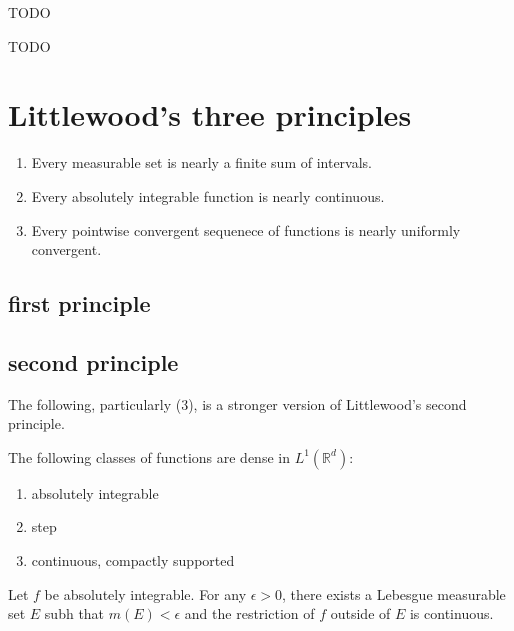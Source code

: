 \documentclass[12pt]{article}
\begin{document}
\begin{proposition}
	TODO
\end{proposition}

\begin{proposition}
	TODO
\end{proposition}



\section{Littlewood's three principles} %

\begin{enumerate}
	\item Every measurable set is nearly a finite sum of intervals.
	\item Every absolutely integrable function is nearly continuous.
	\item Every pointwise convergent sequenece of functions is nearly uniformly convergent.
\end{enumerate}

\subsection{first principle}

\subsection{second principle} %

The following, particularly (3), is a stronger version of Littlewood's second principle.

\begin{theorem} 
	The following classes of functions are dense in $L^1(\mathbb{R}^d)$: \hfill
	\begin{enumerate}
		\item absolutely integrable 
		\item step
		\item continuous, compactly supported
	\end{enumerate}
\end{theorem}

\begin{theorem}
	Let $f$ be absolutely integrable. For any $\epsilon>0$, there exists a Lebesgue measurable set $E$ subh that $m(E)<\epsilon$ and the restriction of $f$ outside of $E$ is continuous.
\end{theorem}
\end{document}
